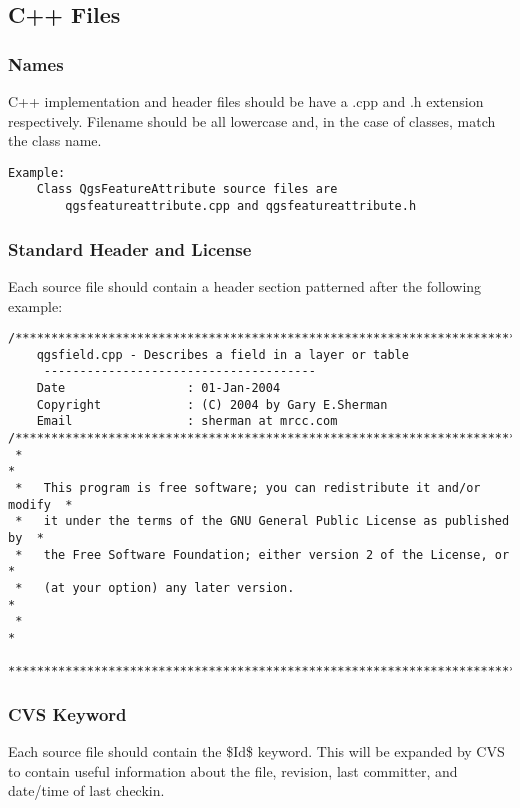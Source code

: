 \subsection{C++ Files}
\subsubsection{Names}
C++ implementation and header files should be have a .cpp and .h extension respectively.
Filename should be all lowercase and, in the case of classes, match the class name.

\begin{verbatim}
Example:
	Class QgsFeatureAttribute source files are 
		qgsfeatureattribute.cpp and qgsfeatureattribute.h
\end{verbatim}

\subsubsection{Standard Header and License}
Each source file should contain a header section patterned after the following example:

\begin{verbatim}
/***************************************************************************
    qgsfield.cpp - Describes a field in a layer or table
     --------------------------------------
    Date                 : 01-Jan-2004
    Copyright            : (C) 2004 by Gary E.Sherman
    Email                : sherman at mrcc.com
/***************************************************************************
 *                                                                         *
 *   This program is free software; you can redistribute it and/or modify  *
 *   it under the terms of the GNU General Public License as published by  *
 *   the Free Software Foundation; either version 2 of the License, or     *
 *   (at your option) any later version.                                   *
 *                                                                         *
 ***************************************************************************/
\end{verbatim}

\subsubsection{CVS Keyword}
Each source file should contain the \$Id\$ keyword. This will be expanded by CVS to contain useful information about the file, revision, last committer, and date/time of last checkin.

